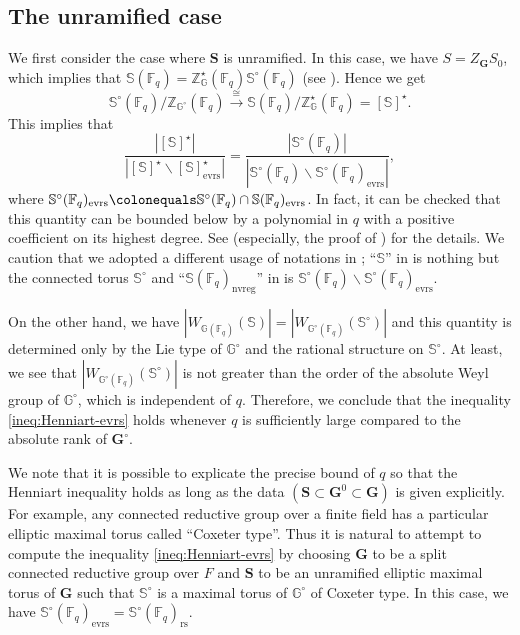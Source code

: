 \documentclass{amsart}
\newcommand{\evrs}{\mathrm{evrs}}
\newcommand{\nvreg}{\mathrm{nvreg}}
\newcommand{\rs}{\mathrm{rs}}
\newcommand{\F}{\mathbb{F}}
\newcommand{\bbS}{\mathbb{S}}
\newcommand{\bbG}{\mathbb{G}}
\newcommand{\bfG}{\mathbf{G}}
\newcommand{\bbZ}{\mathbb{Z}}
\newcommand{\bfS}{\mathbf{S}}
\theoremstyle{plain}
\theoremstyle{definition}
\theoremstyle{remark}
\theoremstyle{theorem}
\begin{document}
\subsection{The unramified case}\label{subsec:Henn-ur}
We first consider the case where $\bfS$ is unramified.
In this case, we have $S=Z_{\bfG}S_{0}$, which implies that $\bbS(\F_{q})=\bbZ^{\star}_{\bbG}(\F_{q})\bbS^{\circ}(\F_{q})$ (see \cite[1095 page]{Kal19}).
Hence we get
\[
\bbS^{\circ}(\F_{q})/\bbZ_{\bbG^{\circ}}(\F_{q})
\xrightarrow{\cong}
\bbS(\F_{q})/\bbZ^{\star}_{\bbG}(\F_{q})=[\bbS]^{\star}.
\]
This implies that
\[
\frac{|[\bbS]^{\star}|}{|[\bbS]^{\star} \smallsetminus [\bbS]^{\star}_\evrs|} 
=\frac{|\bbS^{\circ}(\F_{q})|}{|\bbS^{\circ}(\F_{q}) \smallsetminus \bbS^{\circ}(\F_{q})_{\evrs}|},
\]
where $\bbS^{\circ}(\F_{q})_{\evrs}\colonequals \bbS^{\circ}(\F_{q})\cap\bbS(\F_{q})_{\evrs}$.
In fact, it can be checked that this quantity can be bounded below by a polynomial in $q$ with a positive coefficient on its highest degree.
See \cite[Section 5.1]{CO21} (especially, the proof of \cite[Proposition 5.8]{CO21}) for the details.
We caution that we adopted a different usage of notations in \cite[Section 5.1]{CO21}; ``$\bbS$'' in \cite[Section 5.1]{CO21} is nothing but the connected torus $\bbS^{\circ}$ and ``$\bbS(\F_{q})_{\nvreg}$'' in \cite[Section 5.1]{CO21} is $\bbS^{\circ}(\F_{q}) \smallsetminus \bbS^{\circ}(\F_{q})_\evrs$.

On the other hand, we have $|W_{\bbG(\F_{q})}(\bbS)|=|W_{\bbG^{\circ}(\F_{q})}(\bbS^{\circ})|$ and this quantity is determined only by the Lie type of $\bbG^{\circ}$ and the rational structure on $\bbS^{\circ}$.
At least, we see that $|W_{\bbG^{\circ}(\F_{q})}(\bbS^{\circ})|$ is not greater than the order of the absolute Weyl group of $\bbG^{\circ}$, which is independent of $q$.
Therefore, we conclude that the inequality \eqref{ineq:Henniart-evrs} holds whenever $q$ is sufficiently large compared to the absolute rank of $\bfG^{\circ}$.

We note that it is possible to explicate the precise bound of $q$ so that the Henniart inequality holds as long as the data $(\bfS\subset\bfG^{0}\subset\bfG)$ is given explicitly.
For example, any connected reductive group over a finite field has a particular elliptic maximal torus called ``Coxeter type''.
Thus it is natural to attempt to compute the inequality \eqref{ineq:Henniart-evrs} by choosing $\bfG$ to be a split connected reductive group over $F$ and $\bfS$ to be an unramified elliptic maximal torus of $\bfG$ such that $\bbS^{\circ}$ is a maximal torus of $\bbG^{\circ}$ of Coxeter type.
In this case, we have $\bbS^{\circ}(\F_{q})_{\evrs}=\bbS^{\circ}(\F_{q})_{\rs}$.
\end{document}
